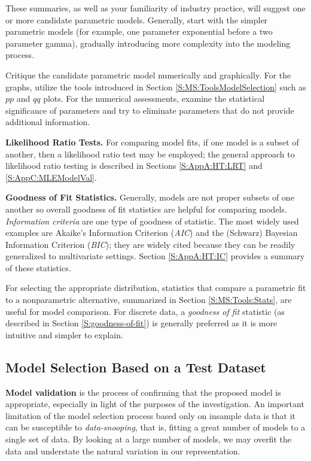 \documentclass[]{book}
\theoremstyle{definition}
\theoremstyle{definition}
\theoremstyle{definition}
\theoremstyle{remark}
\begin{document}
These summaries, as well as your familiarity of industry practice, will
suggest one or more candidate parametric models. Generally, start with
the simpler parametric models (for example, one parameter exponential
before a two parameter gamma), gradually introducing more complexity
into the modeling process.

Critique the candidate parametric model numerically and graphically. For
the graphs, utilize the tools introduced in Section
\ref{S:MS:ToolsModelSelection} such as \(pp\) and \(qq\) plots. For the
numerical assessments, examine the statistical significance of
parameters and try to eliminate parameters that do not provide
additional information.

\textbf{Likelihood Ratio Tests.} For comparing model fits, if one model
is a subset of another, then a likelihood ratio test may be employed;
the general approach to likelihood ratio testing is described in
Sections \ref{S:AppA:HT:LRT} and \ref{S:AppC:MLEModelVal}.

\textbf{Goodness of Fit Statistics.} Generally, models are not proper
subsets of one another so overall goodness of fit statistics are helpful
for comparing models. \emph{Information criteria} are one type of
goodness of statistic. The most widely used examples are Akaike's
Information Criterion (\emph{AIC}) and the (Schwarz) Bayesian
Information Criterion (\emph{BIC}); they are widely cited because they
can be readily generalized to multivariate settings. Section
\ref{S:AppA:HT:IC} provides a summary of these statistics.

For selecting the appropriate distribution, statistics that compare a
parametric fit to a nonparametric alternative, summarized in Section
\ref{S:MS:Tools:Stats}, are useful for model comparison. For discrete
data, a \emph{goodness of fit} statistic (as described in Section
\ref{S:goodness-of-fit}) is generally preferred as it is more intuitive
and simpler to explain.

\subsection{Model Selection Based on a Test
Dataset}\label{model-selection-based-on-a-test-dataset}

\textbf{Model validation} is the process of confirming that the proposed
model is appropriate, especially in light of the purposes of the
investigation. An important limitation of the model selection process
based only on insample data is that it can be susceptible to
\emph{data-snooping}, that is, fitting a great number of models to a
single set of data. By looking at a large number of models, we may
overfit the data and understate the natural variation in our
representation.
\end{document}
